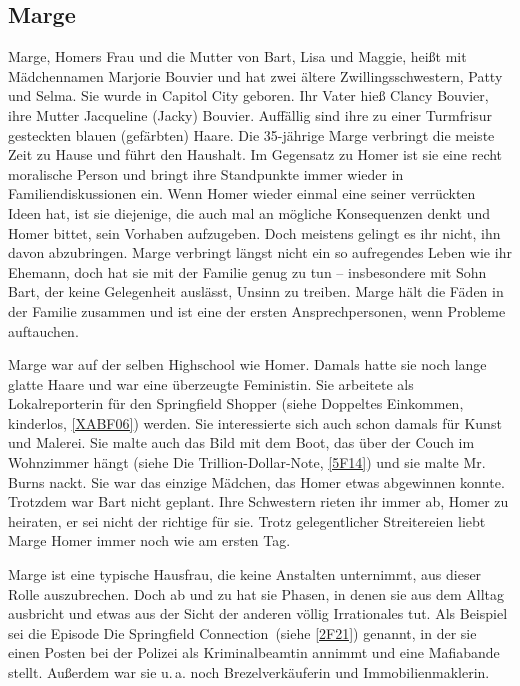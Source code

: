 \subsection{Marge}\label{MargeSimpson}
Marge, Homers Frau und die Mutter von Bart, Lisa und Maggie, heißt mit Mädchennamen Marjorie Bouvier und hat zwei ältere Zwillingsschwestern, Patty und Selma. Sie wurde in Capitol City geboren. Ihr Vater hieß Clancy Bouvier, ihre Mutter Jacqueline (Jacky) Bouvier. Auffällig sind ihre zu einer Turmfrisur gesteckten blauen (gefärbten) Haare. Die 35-jährige Marge verbringt die meiste Zeit zu Hause und führt den Haushalt. Im Gegensatz zu Homer ist sie eine recht moralische Person und bringt ihre Standpunkte immer wieder in Familiendiskussionen ein. Wenn Homer wieder einmal eine seiner verrückten Ideen hat, ist sie diejenige, die auch mal an mögliche Konsequenzen denkt und Homer bittet, sein Vorhaben aufzugeben. Doch meistens gelingt es ihr nicht, ihn davon abzubringen. Marge verbringt längst nicht ein so aufregendes Leben wie ihr Ehemann, doch hat sie mit der Familie genug zu tun -- insbesondere mit Sohn Bart, der keine Gelegenheit auslässt, Unsinn zu treiben. Marge hält die Fäden in der Familie zusammen und ist eine der ersten Ansprechpersonen, wenn Probleme auftauchen.

Marge war auf der selben Highschool wie Homer. Damals hatte sie noch lange glatte Haare und war eine überzeugte Feministin. Sie arbeitete als Lokalreporterin für den Springfield Shopper (siehe \glqq Doppeltes Einkommen, kinderlos\grqq, \ref{XABF06}) werden. Sie interessierte sich auch schon damals für Kunst und Malerei. Sie malte auch das Bild mit dem Boot, das über der Couch im Wohnzimmer hängt (siehe \glqq Die Trillion-Dollar-Note\grqq , \ref{5F14}) und sie malte Mr. Burns nackt. Sie war das einzige Mädchen, das Homer etwas abgewinnen konnte. Trotzdem war Bart nicht geplant. Ihre Schwestern rieten ihr immer ab, Homer zu heiraten, er sei nicht der richtige für sie. Trotz gelegentlicher Streitereien liebt Marge Homer immer noch wie am ersten Tag.

Marge ist eine typische Hausfrau, die keine Anstalten unternimmt, aus dieser Rolle auszubrechen. Doch ab und zu hat sie Phasen, in denen sie aus dem Alltag ausbricht und etwas aus der Sicht der anderen völlig Irrationales tut. Als Beispiel sei die Episode \glqq Die Springfield Connection\grqq\ (siehe \ref{2F21}) genannt, in der sie einen Posten bei der Polizei als Kriminalbeamtin annimmt und eine Mafiabande stellt. Außerdem war sie u.\,a. noch Brezelverkäuferin und Immobilienmaklerin.

